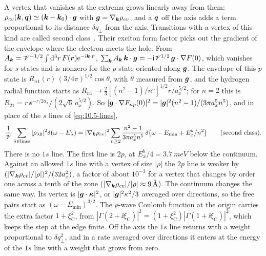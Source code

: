 A vertex that vanishes at the extrema grows linearly away from them: $\rho_{cv}(\bm{k},\bm{q}) \simeq (\bm{k} - \bm{k}_0)\cdot\bm{g}$ with $\bm{g} = \nabla_{\bm{k}}\rho_{cv}$, and a $\bm{q}$ off the axis adds a term proportional to its distance $\delta q_\perp$ from the axis. Transitions with a vertex of this kind are called second class~\cite{elliott1957intensity}. Their exciton form factor picks out the gradient of the envelope where the electron meets the hole. From $A_{\bm{k}} = \mathscr{V}^{-1/2}\int\mathrm{d}^3r\,F(\bm{r})\mathrm{e}^{-\mathrm{i}\bm{k}\cdot\bm{r}}$, $\sum_{\bm{k}}A_{\bm{k}}\,\bm{k}\cdot\bm{g} = -\mathrm{i} \mathscr{V}^{1/2}\,\bm{g}\cdot\nabla F(0)$, which vanishes for $s$ states and is nonzero for the $p$ state oriented along $\bm{g}$. The envelope of this $p$ state is $R_{n1}(r)\,(3/4\pi)^{1/2}\cos\theta$, with $\theta$ measured from $\bm{g}$, and the hydrogen radial function starts as $R_{n1} \to \tfrac23[(n^2 - 1)/n^5]^{1/2}r/a_x^{5/2}$; for $n = 2$ this is $R_{21} = r\,\ee^{-r/2a_x}/(2\sqrt6\,a_x^{5/2})$. So $|\bm{g}\cdot\nabla F_{np}(0)|^2 = |\bm{g}|^2(n^2 - 1)/(3\pi a_x^5n^5)$, and in place of the $s$ lines of \cref{eq:10.5-lines},
\begin{equation}
  \frac1{\mathscr{V}}\sum_{\lambda\in\text{lines}}|\rho_{\lambda0}|^2\delta(\omega - E_\lambda) = |\nabla_{\bm{k}}\rho_{cv}|^2\sum_{n\ge2}\frac{n^2 - 1}{3\pi a_x^5n^5}\,\delta\bigl(\omega - E_{\mathrm{min}} + E_x^b/n^2\bigr) \qquad\text{(second class)} .
  \label{eq:10.5-second}
\end{equation}
There is no $1s$ line. The first line is $2p$, at $E_x^b/4 = \SI{3.7}{meV}$ below the continuum. Against an allowed $1s$ line with a vertex of size $|\rho|$ the $2p$ line is weaker by $(|\nabla_{\bm{k}}\rho_{cv}|/|\rho|)^2/(32a_x^2)$, a factor of about $10^{-3}$ for a vertex that changes by order one across a tenth of the zone ($|\nabla_{\bm{k}}\rho_{cv}|/|\rho| \approx \SI{9}{\angstrom}$). The continuum changes the same way. Its vertex is $|\bm{g}\cdot\bm{\kappa}|^2$, or $|\bm{g}|^2\kappa^2/3$ averaged over directions, so the free pairs start as $(\omega - E_{\mathrm{min}})^{3/2}$. The $p$-wave Coulomb function at the origin carries the extra factor $1 + \xi_{\mathrm{C}}^2$, from $|\Gamma(2 + \ii\xi_{\mathrm{C}})|^2 = (1 + \xi_{\mathrm{C}}^2)|\varGamma(1 + \ii\xi_{\mathrm{C}})|^2$, which keeps the step at the edge finite. Off the axis the $1s$ line returns with a weight proportional to $\delta q_\perp^2$, and in a rate averaged over directions it enters at the energy of the $1s$ line with a weight that grows from zero.

